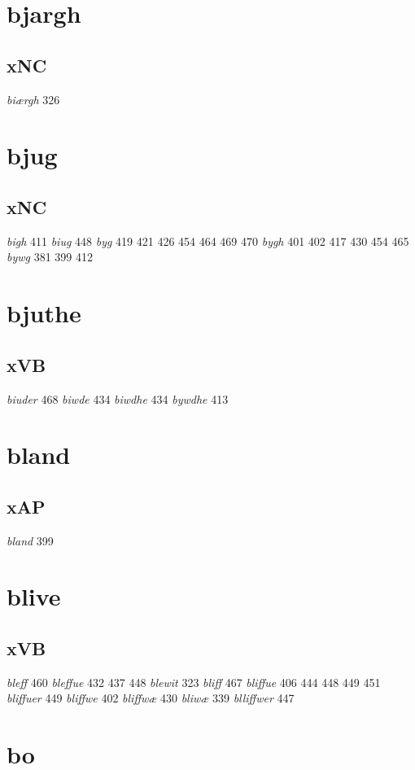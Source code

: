 \documentclass[a4paper,twocolumn]{article}
\begin{document}
\section{bjargh}
\label{sec:orgba0cc23}
\subsection{xNC}
\label{sec:org1ff8a2a}
\emph{biærgh} 326 
\section{bjug}
\label{sec:org606ae3d}
\subsection{xNC}
\label{sec:org5f6bd3a}
\emph{bigh} 411 \emph{biug} 448 \emph{byg} 419 421 426 454 464 469 470 \emph{bygh} 401 402 417 430 454 465 \emph{bywg} 381 399 412 
\section{bjuthe}
\label{sec:org6bb5511}
\subsection{xVB}
\label{sec:org54788db}
\emph{biuder} 468 \emph{biwde} 434 \emph{biwdhe} 434 \emph{bywdhe} 413 
\section{bland}
\label{sec:org3d40137}
\subsection{xAP}
\label{sec:org73242c6}
\emph{bland} 399 
\section{blive}
\label{sec:org583b8fc}
\subsection{xVB}
\label{sec:orge306d6b}
\emph{bleff} 460 \emph{bleffue} 432 437 448 \emph{blewit} 323 \emph{bliff} 467 \emph{bliffue} 406 444 448 449 451 \emph{bliffuer} 449 \emph{bliffwe} 402 \emph{bliffwæ} 430 \emph{bliwæ} 339 \emph{blliffwer} 447 
\section{bo}
\label{sec:org5cad88d}
\end{document}
